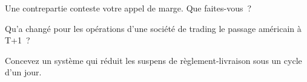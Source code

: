 \begin{interviewq}\label{iq:fm:operations:4}
Une contrepartie conteste votre appel de marge. Que faites-vous~?
\end{interviewq}

\begin{interviewq}\label{iq:fm:operations:5}
Qu'a changé pour les opérations d'une société de trading le passage américain à T+1~?
\end{interviewq}

\begin{interviewq}\label{iq:fm:operations:6}
Concevez un système qui réduit les suspens de règlement-livraison sous un cycle d'un jour.
\end{interviewq}

